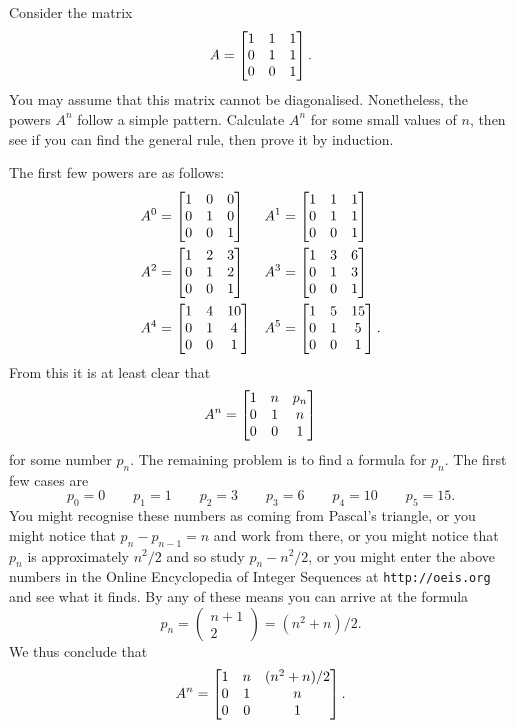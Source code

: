 \documentclass[a4paper]{amsart}
\renewenvironment{solution}{\SolutionInline}{\endSolutionInline}
\begin{document}
\begin{exercise}\label{ex-powers-iii}
 Consider the matrix 
 \[ A = \left[\begin{matrix} 1&1&1 \\ 0&1&1 \\ 0&0&1 \end{matrix}\right]. \]
 You may assume that this matrix cannot be diagonalised.  Nonetheless,
 the powers $A^n$ follow a simple pattern.  Calculate $A^n$ for some
 small values of $n$, then see if you can find the general rule, then
 prove it by induction.
\end{exercise}
\begin{solution}
 The first few powers are as follows:
 \begin{align*}
  A^0 &= \left[\begin{matrix} 1&0& 0 \\ 0&1&0 \\ 0&0&1 \end{matrix}\right] &
  A^1 &= \left[\begin{matrix} 1&1& 1 \\ 0&1&1 \\ 0&0&1 \end{matrix}\right] \\
  A^2 &= \left[\begin{matrix} 1&2& 3 \\ 0&1&2 \\ 0&0&1 \end{matrix}\right] &
  A^3 &= \left[\begin{matrix} 1&3& 6 \\ 0&1&3 \\ 0&0&1 \end{matrix}\right] \\
  A^4 &= \left[\begin{matrix} 1&4&10 \\ 0&1&4 \\ 0&0&1 \end{matrix}\right] &
  A^5 &= \left[\begin{matrix} 1&5&15 \\ 0&1&5 \\ 0&0&1 \end{matrix}\right].
 \end{align*}
 From this it is at least clear that 
 \[ A^n = \left[\begin{matrix} 1 & n & p_n \\ 0 & 1 & n \\ 0 & 0 & 1 \end{matrix}\right] \]
 for some number $p_n$.  The remaining problem is to find a formula
 for $p_n$.  The first few cases are 
 \[ p_0 = 0  \qquad
    p_1 = 1  \qquad
    p_2 = 3  \qquad
    p_3 = 6  \qquad
    p_4 = 10 \qquad
    p_5 = 15. 
 \]
 You might recognise these numbers as coming from Pascal's triangle,
 or you might notice that $p_n-p_{n-1}=n$ and work from there, or you
 might notice that $p_n$ is approximately $n^2/2$ and so study
 $p_n-n^2/2$, or you might enter the above numbers in the Online
 Encyclopedia of Integer Sequences at \verb+http://oeis.org+ and see
 what it finds.  By any of these means you can arrive at the formula 
 \[ p_n = \left(\begin{array}{c} n+1 \\ 2 \end{array}\right) 
        = (n^2+n)/2.
 \] 
 We thus conclude that
 \[ A^n = \left[\begin{matrix} 1 & n & (n^2+n)/2 \\ 0 & 1 & n \\ 0 & 0 & 1 \end{matrix}\right]. \]

\end{solution}
\end{document}
